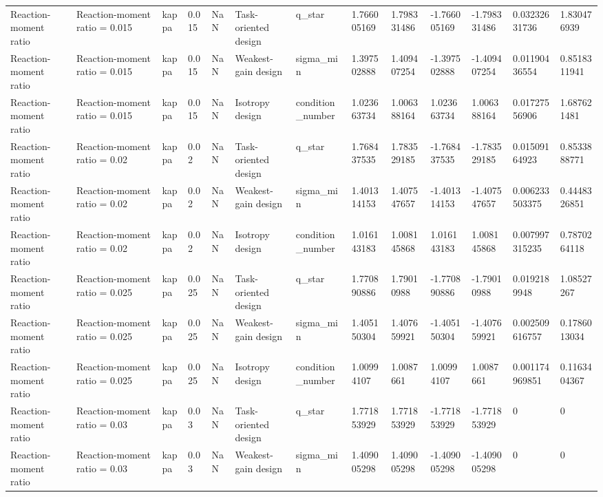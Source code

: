 \begin{tabular}{@{}lllllllllllll@{}}
Reaction-moment ratio & Reaction-moment ratio = 0.015 & kappa & 0.015 & NaN & Task-oriented design & q\_star & 1.766005169 & 1.798331486 & -1.766005169 & -1.798331486 & 0.03232631736 & 1.830476939 \\
Reaction-moment ratio & Reaction-moment ratio = 0.015 & kappa & 0.015 & NaN & Weakest-gain design & sigma\_min & 1.397502888 & 1.409407254 & -1.397502888 & -1.409407254 & 0.01190436554 & 0.8518311941 \\
Reaction-moment ratio & Reaction-moment ratio = 0.015 & kappa & 0.015 & NaN & Isotropy design & condition\_number & 1.023663734 & 1.006388164 & 1.023663734 & 1.006388164 & 0.01727556906 & 1.687621481 \\
Reaction-moment ratio & Reaction-moment ratio = 0.02 & kappa & 0.02 & NaN & Task-oriented design & q\_star & 1.768437535 & 1.783529185 & -1.768437535 & -1.783529185 & 0.01509164923 & 0.8533888771 \\
Reaction-moment ratio & Reaction-moment ratio = 0.02 & kappa & 0.02 & NaN & Weakest-gain design & sigma\_min & 1.401314153 & 1.407547657 & -1.401314153 & -1.407547657 & 0.006233503375 & 0.4448326851 \\
Reaction-moment ratio & Reaction-moment ratio = 0.02 & kappa & 0.02 & NaN & Isotropy design & condition\_number & 1.016143183 & 1.008145868 & 1.016143183 & 1.008145868 & 0.007997315235 & 0.7870264118 \\
Reaction-moment ratio & Reaction-moment ratio = 0.025 & kappa & 0.025 & NaN & Task-oriented design & q\_star & 1.770890886 & 1.79010988 & -1.770890886 & -1.79010988 & 0.0192189948 & 1.08527267 \\
Reaction-moment ratio & Reaction-moment ratio = 0.025 & kappa & 0.025 & NaN & Weakest-gain design & sigma\_min & 1.405150304 & 1.407659921 & -1.405150304 & -1.407659921 & 0.002509616757 & 0.1786013034 \\
Reaction-moment ratio & Reaction-moment ratio = 0.025 & kappa & 0.025 & NaN & Isotropy design & condition\_number & 1.00994107 & 1.0087661 & 1.00994107 & 1.0087661 & 0.001174969851 & 0.1163404367 \\
Reaction-moment ratio & Reaction-moment ratio = 0.03 & kappa & 0.03 & NaN & Task-oriented design & q\_star & 1.771853929 & 1.771853929 & -1.771853929 & -1.771853929 & 0 & 0 \\
Reaction-moment ratio & Reaction-moment ratio = 0.03 & kappa & 0.03 & NaN & Weakest-gain design & sigma\_min & 1.409005298 & 1.409005298 & -1.409005298 & -1.409005298 & 0 & 0 \\

\end{tabular}
